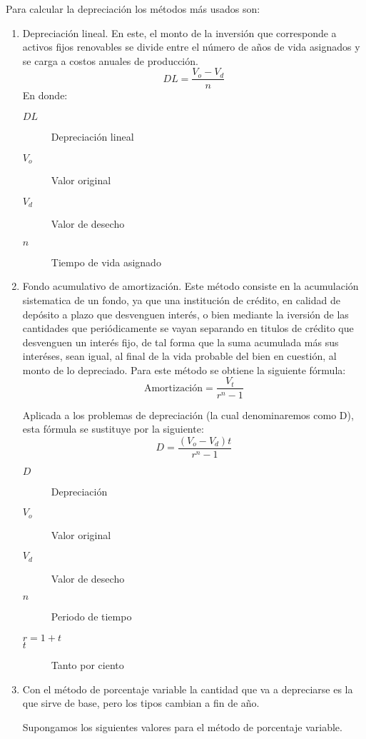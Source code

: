 Para calcular la depreciación los métodos más usados son:
\begin{enumerate}[label=\alph*)]
    \item Depreciación lineal. En este, el monto de la inversión que corresponde a activos fijos renovables se divide
    entre el número de años de vida asignados y se carga a costos anuales de producción.
    \[DL=\frac{V_o-V_d}{n}\]
    En donde:
    \begin{description}
        \item[$DL$] Depreciación lineal
        \item[$V_o$] Valor original
        \item[$V_d$] Valor de desecho
        \item[$n$] Tiempo de vida asignado
    \end{description}
    \item Fondo acumulativo de amortización. Este método consiste en la acumulación sistematica de un fondo, ya que una
    institución de crédito, en calidad de depósito a plazo que desvenguen interés, o bien mediante la iversión de las
    cantidades que periódicamente se vayan separando en titulos de crédito que desvenguen un interés fijo, de tal forma
    que la suma acumulada más sus interéses, sean igual, al final de la vida probable del bien en cuestión, al monto de
    lo depreciado.
    Para este método se obtiene la siguiente fórmula:
    \[\text{Amortización}=\frac{V_t}{r^n-1}\]

    Aplicada a los problemas de depreciación (la cual denominaremos como D), esta fórmula se sustituye por la siguiente:
    \[D=\frac{(V_o-V_d)t}{r^n-1}\]
    \begin{description}
        \item[$D$] Depreciación
        \item[$V_o$] Valor original
        \item[$V_d$] Valor de desecho
        \item[$n$] Periodo de tiempo
        \item[$r=1+t$]
        \item[$t$] Tanto por ciento
    \end{description}
    \item Con el método de porcentaje variable la cantidad que va a depreciarse es la que sirve de base, pero los tipos
    cambian a fin de año.

    Supongamos los siguientes valores para el método de porcentaje variable.


\end{enumerate}
